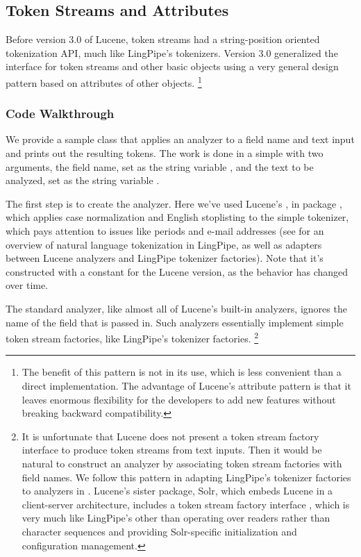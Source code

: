 \subsection{Token Streams and Attributes}

Before version 3.0 of Lucene, token streams had a string-position
oriented tokenization API, much like LingPipe's tokenizers.  Version
3.0 generalized the interface for token streams and other basic
objects using a very general design pattern based on attributes of
other objects.
%
\footnote{The benefit of this pattern is not in its use, which is less
  convenient than a direct implementation.  The advantage of Lucene's
  attribute pattern is that it leaves enormous flexibility for the
  developers to add new features without breaking backward
  compatibility.}


\subsubsection{Code Walkthrough}

We provide a sample class  that applies an
analyzer to a field name and text input and prints out the resulting
tokens.  The work is done in a simple  with two
arguments, the field name, set as the string variable
, and the text to be analyzed, set as the string
variable .

The first step is to create the analyzer.
%
%
Here we've used Lucene's , in package
, which applies case
normalization and English stoplisting to the simple tokenizer, which
pays attention to issues like periods and e-mail addresses (see
 for an overview of natural language
tokenization in LingPipe, as well as adapters between Lucene analyzers
and LingPipe tokenizer factories).  Note that it's constructed with a
constant for the Lucene version, as the behavior has changed over
time.

The standard analyzer, like almost all of Lucene's built-in analyzers,
ignores the name of the field that is passed in.  Such analyzers
essentially implement simple token stream factories, like LingPipe's
tokenizer factories.%
%
\footnote{It is unfortunate that Lucene does not present a token
  stream factory interface to produce token streams from text inputs.
  Then it would be natural to construct an analyzer by associating
  token stream factories with field names.  We follow this pattern in
  adapting LingPipe's tokenizer factories to analyzers in
  .  Lucene's sister package,
  Solr, which embeds Lucene in a client-server architecture, includes
  a token stream factory interface , which is
  very much like LingPipe's other than operating over readers rather
  than character sequences and providing Solr-specific initialization
  and configuration management.}

